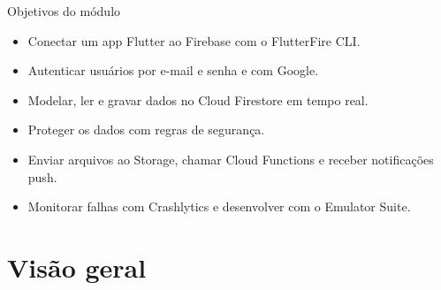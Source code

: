 \documentclass[aspectratio=169,10pt]{beamer}
\begin{document}
\capa

\begin{frame}{Objetivos do módulo}
  \begin{conceito}
    \begin{itemize}
      \item Conectar um app Flutter ao Firebase com o FlutterFire CLI.
      \item Autenticar usuários por e-mail e senha e com Google.
      \item Modelar, ler e gravar dados no Cloud Firestore em tempo real.
      \item Proteger os dados com regras de segurança.
      \item Enviar arquivos ao Storage, chamar Cloud Functions e receber notificações push.
      \item Monitorar falhas com Crashlytics e desenvolver com o Emulator Suite.
    \end{itemize}
  \end{conceito}
\end{frame}

\sumario



\section{Visão geral}
\end{document}
